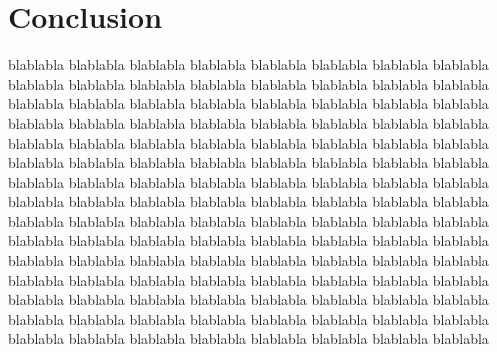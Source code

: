\documentclass[runningheads]{llncs}
\begin{document}
\section{Conclusion}
blablabla
blablabla
blablabla
blablabla
blablabla
blablabla
blablabla
blablabla
blablabla
blablabla
blablabla
blablabla
blablabla
blablabla
blablabla
blablabla
blablabla
blablabla
blablabla
blablabla
blablabla
blablabla
blablabla
blablabla
blablabla
blablabla
blablabla
blablabla
blablabla
blablabla
blablabla
blablabla
blablabla
blablabla
blablabla
blablabla
blablabla
blablabla
blablabla
blablabla
blablabla
blablabla
blablabla
blablabla
blablabla
blablabla
blablabla
blablabla
blablabla
blablabla
blablabla
blablabla
blablabla
blablabla
blablabla
blablabla
blablabla
blablabla
blablabla
blablabla
blablabla
blablabla
blablabla
blablabla
blablabla
blablabla
blablabla
blablabla
blablabla
blablabla
blablabla
blablabla
blablabla
blablabla
blablabla
blablabla
blablabla
blablabla
blablabla
blablabla
blablabla
blablabla
blablabla
blablabla
blablabla
blablabla
blablabla
blablabla
blablabla
blablabla
blablabla
blablabla
blablabla
blablabla
blablabla
blablabla
blablabla
blablabla
blablabla
blablabla
blablabla
blablabla
blablabla
blablabla
blablabla
blablabla
blablabla
blablabla
blablabla
blablabla
blablabla
blablabla
blablabla
blablabla
blablabla
blablabla
blablabla
blablabla
blablabla
blablabla


\end{document}
